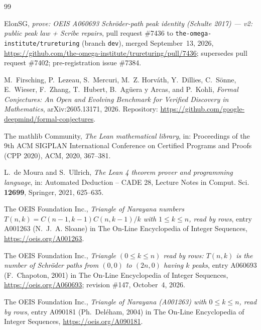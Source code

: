 \documentclass[11pt]{amsart}
\theoremstyle{plain}
\theoremstyle{definition}
\begin{document}
{\footnotesize
\begin{thebibliography}{99}

ElonSG, \emph{prove: OEIS A060693 Schröder-path peak identity (Schulte 2017) --- v2: public peak law + Scribe repairs}, pull request \#7436 to \texttt{the-omega-institute/trureturing} (branch \texttt{dev}), merged September~13, 2026, \url{https://github.com/the-omega-institute/trureturing/pull/7436}; supersedes pull request \#7402; pre-registration issue \#7384.

M.~Firsching, P.~Lezeau, S.~Mercuri, M.~Z. Horv\'ath, Y.~Dillies, C.~S\"onne, E.~Wieser, F.~Zhang, T.~Hubert, B.~Ag\"uera y Arcas, and P.~Kohli, \emph{Formal Conjectures: An Open and Evolving Benchmark for Verified Discovery in Mathematics}, arXiv:2605.13171, 2026. Repository: \url{https://github.com/google-deepmind/formal-conjectures}.

The mathlib Community, \emph{The Lean mathematical library}, in: Proceedings of the 9th ACM SIGPLAN International Conference on Certified Programs and Proofs (CPP 2020), ACM, 2020, 367--381.

L.~de Moura and S.~Ullrich, \emph{The Lean 4 theorem prover and programming language}, in: Automated Deduction -- CADE 28, Lecture Notes in Comput. Sci. \textbf{12699}, Springer, 2021, 625--635.

The OEIS Foundation Inc., \emph{Triangle of Narayana numbers $T(n,k)=C(n-1,k-1)C(n,k-1)/k$ with $1\le k\le n$, read by rows}, entry A001263 (N.~J.~A. Sloane) in The On-Line Encyclopedia of Integer Sequences, \url{https://oeis.org/A001263}.

The OEIS Foundation Inc., \emph{Triangle $(0\le k\le n)$ read by rows: $T(n,k)$ is the number of Schröder paths from $(0,0)$ to $(2n,0)$ having $k$ peaks}, entry A060693 (F.~Chapoton, 2001) in The On-Line Encyclopedia of Integer Sequences, \url{https://oeis.org/A060693}; revision \#147, October~4, 2026.

The OEIS Foundation Inc., \emph{Triangle of Narayana (A001263) with $0\le k\le n$, read by rows}, entry A090181 (Ph.~Deléham, 2004) in The On-Line Encyclopedia of Integer Sequences, \url{https://oeis.org/A090181}.

\end{thebibliography}
}
\end{document}
